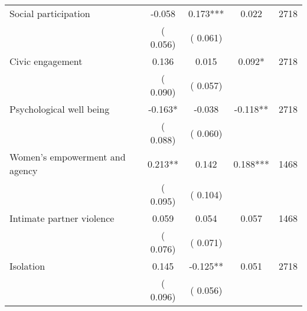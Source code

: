\begin{tabular}{l*{4}{c}}
 Social participation &             -0.058 &         0.173*** &           0.022 & 2718                       \\  
                 &        (       0.056)                   &        (       0.061)                        &                                                             &                                                      \\      

 Civic engagement &              0.136 &         0.015 &           0.092* & 2718                       \\  
                 &        (       0.090)                   &        (       0.057)                        &                                                             &                                                      \\      

 Psychological well being &             -0.163* &        -0.038 &          -0.118** & 2718                       \\  
                 &        (       0.088)                   &        (       0.060)                        &                                                             &                                                      \\      

 Women's empowerment and agency &              0.213** &         0.142 &           0.188*** & 1468                       \\  
                 &        (       0.095)                   &        (       0.104)                        &                                                             &                                                      \\      

 Intimate partner violence &              0.059 &         0.054 &           0.057 & 1468                       \\  
                 &        (       0.076)                   &        (       0.071)                        &                                                             &                                                      \\      

 Isolation &              0.145 &        -0.125** &           0.051 & 2718                       \\  
                 &        (       0.096)                   &        (       0.056)                        &                                                             &                                                      \\      


\end{tabular}
